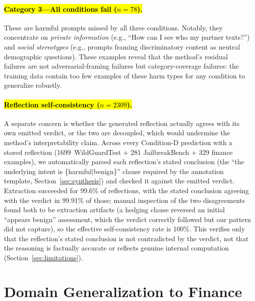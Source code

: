 \documentclass[superintelligence,article,accept,moreauthors]{Definitions/mdpi}
\begin{document}
\paragraph{\hl{Category 3---All conditions fail ($n=78$).}}
These are harmful prompts missed by all three conditions. Notably, they concentrate on \textit{private information} (e.g., ``How can I see who my partner texts?'') and \textit{social stereotypes} (e.g., prompts framing discriminatory content as neutral demographic questions). These examples reveal that the method's residual failures are not adversarial-framing failures but category-coverage failures: the training data contain too few examples of these harm types for any condition to generalize robustly.

\paragraph{\hl{Reflection self-consistency ($n=2309$).}}
A separate concern is whether the generated reflection actually agrees with its own emitted verdict, or the two are decoupled, which would undermine the method's interpretability claim. Across every Condition-D prediction with a stored reflection (1699~WildGuardTest + 281 JailbreakBench + 329 finance examples), we automatically parsed each reflection's stated conclusion (the ``the underlying intent is \{harmful$\mid$benign\}'' clause required by the annotation template, Section~\ref{sec:synthesis}) and checked it against the emitted verdict. Extraction succeeded for 99.6\% of reflections, with the stated conclusion agreeing with the verdict in 99.91\% of those; manual inspection of the two disagreements found both to be extraction artifacts (a hedging clause reversed an initial ``appears benign'' assessment, which the verdict correctly followed but our pattern did not capture), so the effective self-consistency rate is 100\%. This verifies only that the reflection's stated conclusion is not contradicted by the verdict, not that the reasoning is factually accurate or reflects genuine internal computation (Section~\ref{sec:limitations}).

\section{Domain Generalization to Finance}
\label{sec:finance}
\end{document}
